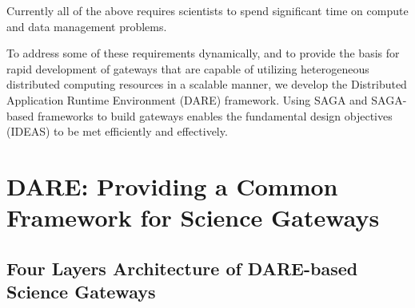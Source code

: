 \documentclass[]{svjour3}
\begin{document}
Currently all of the above requires scientists to spend significant
time on compute and data management problems. 

To address some of these requirements dynamically, and to provide the
basis for rapid development of gateways that are capable of utilizing
heterogeneous distributed computing resources in a scalable manner, we
develop the Distributed Application Runtime Environment (DARE)
framework\cite{dareurl}. Using SAGA and SAGA-based frameworks to build
gateways enables the fundamental design objectives (IDEAS) to be met
efficiently and effectively.





 

\section{DARE: Providing a Common Framework for Science Gateways}

\subsection{Four Layers Architecture of DARE-based Science Gateways}
\end{document}
